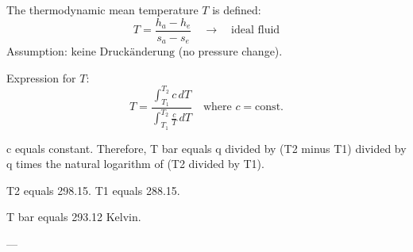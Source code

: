 The thermodynamic mean temperature \( T \) is defined:  
\[
T = \frac{h_a - h_e}{s_a - s_e} \quad \rightarrow \quad \text{ideal fluid}
\]  
Assumption: \( \text{keine Druckänderung} \) (no pressure change).  

Expression for \( T \):  
\[
T = \frac{\int_{T_1}^{T_2} c \, dT}{\int_{T_1}^{T_2} \frac{c}{T} \, dT} \quad \text{where } c = \text{const.}
\]

c equals constant.  
Therefore, T bar equals q divided by (T2 minus T1) divided by q times the natural logarithm of (T2 divided by T1).  

T2 equals 298.15.  
T1 equals 288.15.  

T bar equals 293.12 Kelvin.  

---